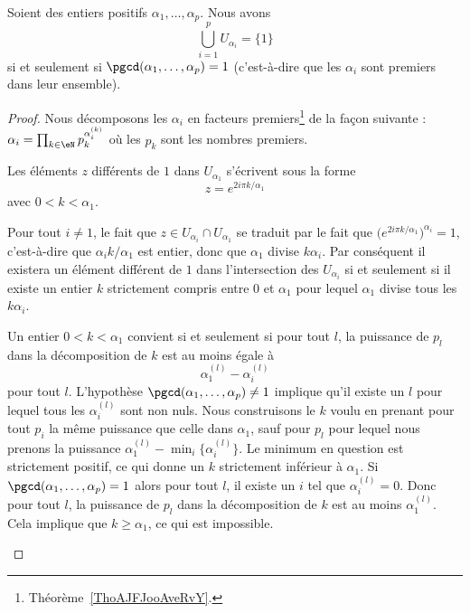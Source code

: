 \begin{proposition}   \label{PropFDDHooEyYxBC}
	Soient des entiers positifs \( \alpha_1,\ldots, \alpha_p\). Nous avons
	\begin{equation}
		\bigcup_{i=1}^p U_{\alpha_i}=\{ 1 \}
	\end{equation}
	si et seulement si \( \pgcd(\alpha_1,\ldots, \alpha_p)=1\) (c'est-à-dire que les \( \alpha_i\) sont premiers dans leur ensemble).
\end{proposition}

\begin{proof}
	Nous décomposons les \( \alpha_i\) en facteurs premiers\footnote{Théorème~\ref{ThoAJFJooAveRvY}.} de la façon suivante : \( \alpha_i=\prod_{k\in \eN}p_k^{\alpha_i^{(k)}}\) où les \( p_k\) sont les nombres premiers.

	\begin{subproof}
		Les éléments \( z\) différents de \( 1\) dans \( U_{\alpha_1}\) s'écrivent sous la forme
		\begin{equation}
			z= e^{2i\pi k/\alpha_1}
		\end{equation}
		avec \( 0<k<\alpha_1\).

		Pour tout \( i\neq 1\), le fait que \( z\in U_{\alpha_i}\cap U_{\alpha_1}\) se traduit par le fait que \( \big(  e^{2i\pi k/\alpha_1} \big)^{\alpha_i}=1\), c'est-à-dire que \( \alpha_ik/\alpha_1\) est entier, donc que \( \alpha_1\) divise \( k\alpha_i\). Par conséquent il existera un élément différent de \( 1\) dans l'intersection des \( U_{\alpha_i}\) si et seulement si il existe un entier \( k\) strictement compris entre \( 0\) et \( \alpha_1\) pour lequel \( \alpha_1\) divise tous les \( k\alpha_i\).

		Un entier \( 0<k<\alpha_1\) convient si et seulement si pour tout \( l\), la puissance de \( p_l\) dans la décomposition de \( k\) est au moins égale à
		\begin{equation}
			\alpha_1^{(l)}-\alpha_i^{(l)}
		\end{equation}
		pour tout \( l\).
		L'hypothèse \( \pgcd(\alpha_1,\ldots, \alpha_p)\neq 1\) implique qu'il existe un \( l\) pour lequel tous les \( \alpha_i^{(l)}\) sont non nuls. Nous construisons le \( k\) voulu en prenant pour tout \( p_i\) la même puissance que celle dans \( \alpha_1\), sauf pour \( p_l\) pour lequel nous prenons la puissance \(  \alpha_1^{(l)}-\min_i\{   \alpha_i^{(l)} \} \). Le minimum en question est strictement positif, ce qui donne un \( k\) strictement inférieur à \( \alpha_1\).
		Si \( \pgcd(\alpha_1,\ldots, \alpha_p)=1\) alors pour tout \( l\), il existe un \( i\) tel que \( \alpha_i^{(l)}=0\). Donc pour tout \( l\), la puissance de \( p_l\) dans la décomposition de \( k\) est au moins \( \alpha_1^{(l)}\). Cela implique que \( k\geq \alpha_1\), ce qui est impossible.
	\end{subproof}
\end{proof}

